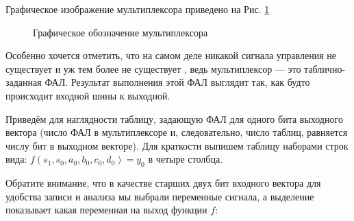 \par{Графическое изображение мультиплексора приведено на Рис. \ref{fig:mux}}

\begin{figure}[H]
  \centering
  \def\svgwidth{\columnwidth}
  
  \caption{Графическое обозначение мультиплексора}
  \label{fig:mux}
\end{figure}

\par{Особенно хочется отметить, что на самом деле никакой  сигнала управления не существует и уж тем более не существует , ведь мультиплексор — это таблично-заданная ФАЛ. Результат выполнения этой ФАЛ выглядит так, как будто происходит   входной шины к выходной.}

\par{Приведём для наглядности таблицу, задающую ФАЛ для одного бита выходного вектора (число ФАЛ в мультиплексоре и, следовательно, число таблиц, равняется числу бит в выходном векторе). Для краткости выпишем таблицу наборами строк вида: $f(s_1, s_0, a_0, b_0, c_0, d_0) = y_0$ в четыре столбца.}

\par{Обратите внимание, что в качестве старших двух бит входного вектора для удобства записи и анализа мы выбрали переменные  сигнала, а выделение показывает какая переменная  на выход функции $f$:}

